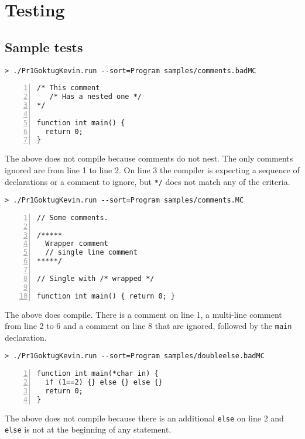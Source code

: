 \documentclass{article}
\begin{document}
\section{Testing}
\subsection{Sample tests}

\begin{verbatim}
> ./Pr1GoktugKevin.run --sort=Program samples/comments.badMC
\end{verbatim}
\begin{Verbatim}[numbers=left,xleftmargin=5mm]
/* This comment
   /* Has a nested one */
*/

function int main() {
  return 0;
}
\end{Verbatim}

The above does not compile because comments do not nest. The only comments ignored are from line 1 to line 2. On line 3 the compiler is expecting a sequence of declarations or a comment to ignore, but \verb|*/| does not match any of the criteria.

\begin{verbatim}
> ./Pr1GoktugKevin.run --sort=Program samples/comments.MC
\end{verbatim}
\begin{Verbatim}[numbers=left,xleftmargin=5mm]
// Some comments.

/*****
  Wrapper comment
  // single line comment
*****/

// Single with /* wrapped */

function int main() { return 0; }
\end{Verbatim}

The above does compile. There is a comment on line 1, a multi-line comment from line 2 to 6 and a comment on line 8 that are ignored, followed by the \verb|main| declaration.

\begin{verbatim}
> ./Pr1GoktugKevin.run --sort=Program samples/doubleelse.badMC
\end{verbatim}
\begin{Verbatim}[numbers=left,xleftmargin=5mm]
function int main(*char in) {
  if (1==2) {} else {} else {}
  return 0;
}
\end{Verbatim}

The above does not compile because there is an additional \verb|else| on line 2 and \verb|else| is not at the beginning of any statement.
\end{document}

